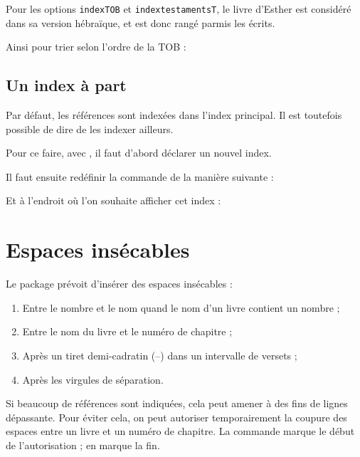 Pour les options \verb|indexTOB| et \verb|indextestamentsT|, le livre d'Esther est considéré dans sa version hébraïque, et est donc rangé parmis les  écrits.

Ainsi pour trier selon l'ordre de la TOB : 
\begin{latexcode}
\usepackage[indexTOB]{bibleref-french}
\end{latexcode}


\subsection{Un index à part}

Par défaut, les références sont indexées dans l'index principal. Il est toutefois possible de dire de les indexer ailleurs.

Pour ce faire, avec , il faut d'abord déclarer un nouvel index.

\begin{latexcode}
\end{latexcode}

Il faut ensuite redéfinir la commande  de la manière suivante :
\begin{latexcode}
\renewcommand{\biblerefindex}[0]{\sindex[sources]}
\end{latexcode}

Et à l'endroit où l'on souhaite afficher cet index :
\begin{latexcode}
\printindex[bible]
\end{latexcode}

\section{Espaces insécables}

Le package  prévoit d'insérer des espaces insécables :
\begin{enumerate}
\item Entre le nombre et le nom quand le nom d’un livre contient un nombre ;
\item Entre le nom du livre et le numéro de chapitre ;
\item Après un tiret demi-cadratin (–) dans un intervalle de versets ; 
\item Après les virgules de séparation.
\end{enumerate}

Si beaucoup de références sont indiquées, cela peut amener à des fins de lignes dépassante.
Pour éviter cela, on peut autoriser temporairement la coupure des espaces entre un livre et un numéro de chapitre. La commande  marque le début de l'autorisation ;  en marque la fin.

